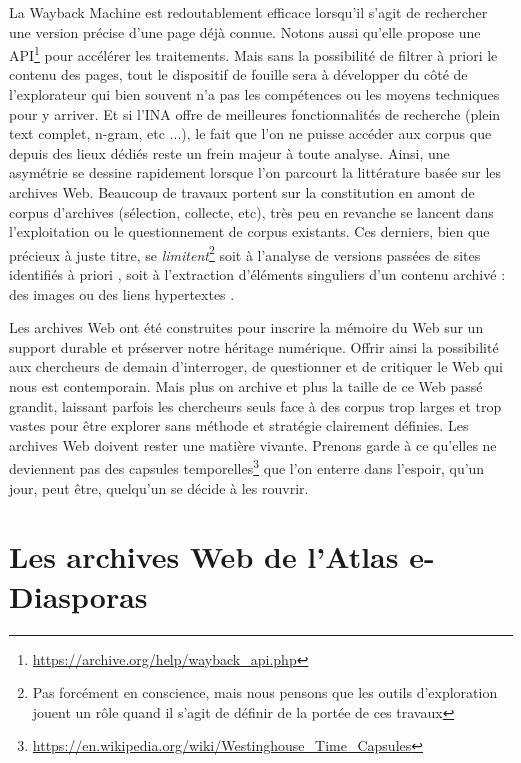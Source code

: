 \documentclass[symmetric,justified,marginals=raggedouter]{tufte-book}
\begin{document}
La Wayback Machine est redoutablement efficace lorsqu'il s'agit de rechercher une version précise d'une page déjà connue. Notons aussi qu'elle propose une API\footnote{\url{https://archive.org/help/wayback_api.php}} pour accélérer les traitements. Mais sans la possibilité de filtrer à priori le contenu des pages, tout le dispositif de fouille sera à développer du côté de l'explorateur qui bien souvent n'a pas les compétences ou les moyens techniques pour y arriver. Et si l'INA offre de meilleures fonctionnalités de recherche (plein text complet, n-gram, etc ...), le fait que l'on ne puisse accéder aux corpus que depuis des lieux dédiés reste un frein majeur à toute analyse. Ainsi, une asymétrie se dessine rapidement lorsque l'on parcourt la littérature basée sur les archives Web. Beaucoup de travaux portent sur la constitution en amont de corpus d'archives (sélection, collecte, etc), très peu en revanche se lancent dans l'exploitation ou le questionnement de corpus existants. Ces derniers, bien que précieux à juste titre, se \textit{limitent}\footnote{Pas forcément en conscience, mais nous pensons que les outils d'exploration jouent un rôle quand il s'agit de définir de la portée de ces travaux} soit à l'analyse de versions passées de sites identifiés à priori \citep{schafer_web_2016,gebeil_les_2016}, soit à l'extraction d'éléments singuliers d'un contenu archivé : des images \citep{ben-david_internet_2018} ou des liens hypertextes \citep{weltevrede_where_2012}.

Les archives Web ont été construites pour inscrire la mémoire du Web sur un support durable et préserver notre héritage numérique. Offrir ainsi la possibilité aux chercheurs de demain d'interroger, de questionner et de critiquer le Web qui nous est contemporain. Mais plus on archive et plus la taille de ce Web passé grandit, laissant parfois les chercheurs seuls face à des corpus trop larges et trop vastes pour être explorer sans méthode et stratégie clairement définies. Les archives Web doivent rester une matière vivante. Prenons garde à ce qu'elles ne deviennent pas des capsules temporelles\footnote{\url{https://en.wikipedia.org/wiki/Westinghouse\_Time\_Capsules}} que l'on enterre dans l'espoir, qu'un jour, peut être, quelqu'un se décide à les rouvrir.   



\section{Les archives Web de l'Atlas e-Diasporas}
\label{sec:3_edias}
\end{document}
